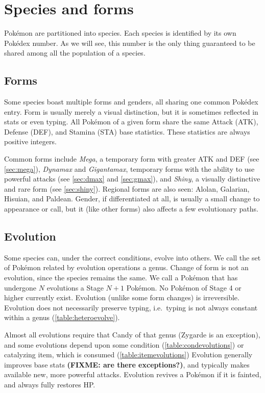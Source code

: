 \chapter{Species and forms}
\label{chap:species}
Pokémon are partitioned into species.
Each species is identified by its own Pokédex number.
As we will see, this number is the only thing guaranteed to be shared
 among all the population of a species.

\section{Forms}
\label{sec:forms}
Some species boast multiple forms and genders, all sharing one common Pokédex entry.
Form is usually merely a visual distinction, but it is sometimes reflected
 in stats or even typing.
All Pokémon of a given form share the same Attack (ATK), Defense (DEF), and
 Stamina (STA) base statistics.
These statistics are always positive integers.

Common forms include \textit{Mega}, a temporary form with greater ATK and DEF (see \autoref{sec:mega}),
  \textit{Dynamax} and \textit{Gigantamax}, temporary forms with the ability to use
  powerful attacks (see \autoref{sec:dmax} and \autoref{sec:gmax}),
  and \textit{Shiny}, a visually distinctive and rare form (see \autoref{sec:shiny}).
Regional forms are also seen: Alolan, Galarian, Hisuian, and Paldean.
Gender, if differentiated at all, is usually a small change to
 appearance or call, but it (like other forms) also affects a few evolutionary
 paths.

\section{Evolution}
\label{sec:evolution}
Some species can, under the correct conditions, evolve into others.
We call the set of Pokémon related by evolution operations a genus.
Change of form is not an evolution, since the species remains the same.
We call a Pokémon that has undergone $N$ evolutions a Stage $N+1$ Pokémon.
No Pokémon of Stage 4 or higher currently exist.
Evolution (unlike some form changes) is irreversible.
Evolution does not necessarily preserve typing, i.e.\ typing is not always
  constant within a genus (\autoref{table:heteroevolve}).

Almost all evolutions require that Candy of that genus (Zygarde is an exception),
  and some evolutions depend upon some condition (\autoref{table:condevolutions})
  or catalyzing item, which is consumed (\autoref{table:itemevolutions})
Evolution generally improves base stats \textbf{(FIXME: are there exceptions?)},
  and typically makes available new, more powerful attacks.
Evolution revives a Pokémon if it is fainted, and always fully restores HP\@.

